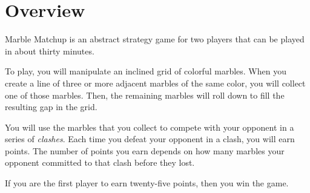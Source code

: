 \section*{Overview}
Marble Matchup is an abstract strategy game for two players that can be played in about thirty minutes.

To play, you will manipulate an inclined grid of colorful marbles.
When you create a line of three or more adjacent marbles of the same color, you will collect one of those marbles.
Then, the remaining marbles will roll down to fill the resulting gap in the grid.

You will use the marbles that you collect to compete with your opponent in a series of \emph{clashes}.
Each time you defeat your opponent in a clash, you will earn points.
The number of points you earn depends on how many marbles your opponent committed to that clash before they lost.

If you are the first player to earn twenty-five points, then you win the game. 

